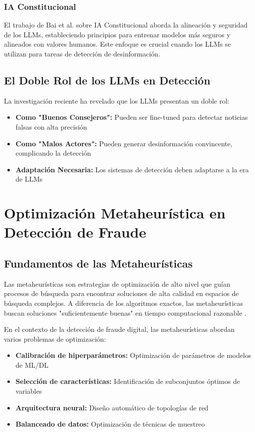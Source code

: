 \subsubsection{IA Constitucional}

El trabajo de Bai et al. \cite{bai2022constitutional} sobre IA Constitucional aborda la alineación y seguridad de los LLMs, estableciendo principios para entrenar modelos más seguros y alineados con valores humanos. Este enfoque es crucial cuando los LLMs se utilizan para tareas de detección de desinformación.

\subsection{El Doble Rol de los LLMs en Detección}

La investigación reciente ha revelado que los LLMs presentan un doble rol:
\begin{itemize}
    \item \textbf{Como "Buenos Consejeros":} Pueden ser fine-tuned para detectar noticias falsas con alta precisión \cite{hu2024bad}
    \item \textbf{Como "Malos Actores":} Pueden generar desinformación convincente, complicando la detección \cite{su2023fake}
    \item \textbf{Adaptación Necesaria:} Los sistemas de detección deben adaptarse a la era de LLMs \cite{su2023adapting}
\end{itemize}

\section{Optimización Metaheurística en Detección de Fraude}
\label{sec:optimizacion_metaheuristica}

\subsection{Fundamentos de las Metaheurísticas}

Las metaheurísticas son estrategias de optimización de alto nivel que guían procesos de búsqueda para encontrar soluciones de alta calidad en espacios de búsqueda complejos. A diferencia de los algoritmos exactos, las metaheurísticas buscan soluciones "suficientemente buenas" en tiempo computacional razonable \cite{anselmo2013diseno}.

En el contexto de la detección de fraude digital, las metaheurísticas abordan varios problemas de optimización:
\begin{itemize}
    \item \textbf{Calibración de hiperparámetros:} Optimización de parámetros de modelos de ML/DL
    \item \textbf{Selección de características:} Identificación de subconjuntos óptimos de variables
    \item \textbf{Arquitectura neural:} Diseño automático de topologías de red
    \item \textbf{Balanceado de datos:} Optimización de técnicas de muestreo
\end{itemize}

